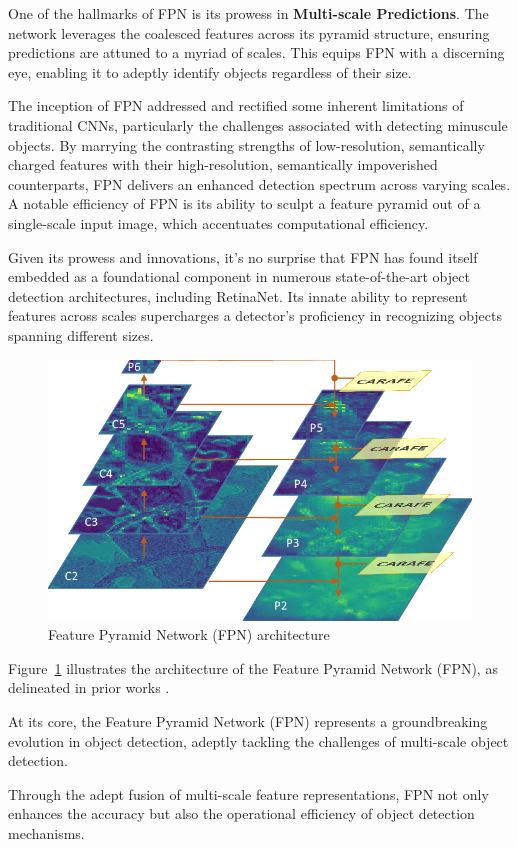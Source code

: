 \documentclass{article}
\begin{document}
One of the hallmarks of FPN is its prowess in \textbf{Multi-scale Predictions}. The network leverages the coalesced features across its pyramid structure, ensuring predictions are attuned to a myriad of scales. This equips FPN with a discerning eye, enabling it to adeptly identify objects regardless of their size.

The inception of FPN addressed and rectified some inherent limitations of traditional CNNs, particularly the challenges associated with detecting minuscule objects. By marrying the contrasting strengths of low-resolution, semantically charged features with their high-resolution, semantically impoverished counterparts, FPN delivers an enhanced detection spectrum across varying scales. A notable efficiency of FPN is its ability to sculpt a feature pyramid out of a single-scale input image, which accentuates computational efficiency.

Given its prowess and innovations, it's no surprise that FPN has found itself embedded as a foundational component in numerous state-of-the-art object detection architectures, including RetinaNet. Its innate ability to represent features across scales supercharges a detector's proficiency in recognizing objects spanning different sizes.

\begin{figure}[h]
  \centering
  \includegraphics[width=0.7\linewidth]{images/fpn}
  \caption{Feature Pyramid Network (FPN) architecture}
  \label{fig:fpn}
\end{figure}

Figure~\ref{fig:fpn} illustrates the architecture of the Feature Pyramid Network (FPN), as delineated in prior works \cite{wang2019carafe}.

At its core, the Feature Pyramid Network (FPN) represents a groundbreaking evolution in object detection, 
adeptly tackling the challenges of multi-scale object detection. 

Through the adept fusion of multi-scale feature representations, FPN not only enhances the accuracy but also the operational efficiency of object detection mechanisms.
\end{document}
